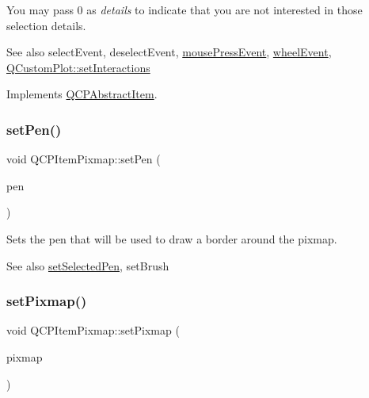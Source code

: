 You may pass 0 as {\itshape details} to indicate that you are not interested in those selection details.

\begin{DoxySeeAlso}{See also}
select\+Event, deselect\+Event, \hyperlink{class_q_c_p_layerable_af6567604818db90f4fd52822f8bc8376}{mouse\+Press\+Event}, \hyperlink{class_q_c_p_layerable_a47dfd7b8fd99c08ca54e09c362b6f022}{wheel\+Event}, \hyperlink{class_q_custom_plot_a5ee1e2f6ae27419deca53e75907c27e5}{Q\+Custom\+Plot\+::set\+Interactions} 
\end{DoxySeeAlso}


Implements \hyperlink{class_q_c_p_abstract_item_ae41d0349d68bb802c49104afd100ba2a}{Q\+C\+P\+Abstract\+Item}.

\mbox{\label{class_q_c_p_item_pixmap_acdade1305edb4b5cae14f97fd132065f}} 
\subsubsection{\texorpdfstring{set\+Pen()}{setPen()}}
{\footnotesize\ttfamily void Q\+C\+P\+Item\+Pixmap\+::set\+Pen (\begin{DoxyParamCaption}\item[{const Q\+Pen \&}]{pen }\end{DoxyParamCaption})}

Sets the pen that will be used to draw a border around the pixmap.

\begin{DoxySeeAlso}{See also}
\hyperlink{class_q_c_p_item_pixmap_afc5e479e88e53740176ce77cb70dd67a}{set\+Selected\+Pen}, set\+Brush 
\end{DoxySeeAlso}
\mbox{\label{class_q_c_p_item_pixmap_a726b69ea4025edf48f9b29b6450548a7}} 
\subsubsection{\texorpdfstring{set\+Pixmap()}{setPixmap()}}
{\footnotesize\ttfamily void Q\+C\+P\+Item\+Pixmap\+::set\+Pixmap (\begin{DoxyParamCaption}\item[{const Q\+Pixmap \&}]{pixmap }\end{DoxyParamCaption})}

